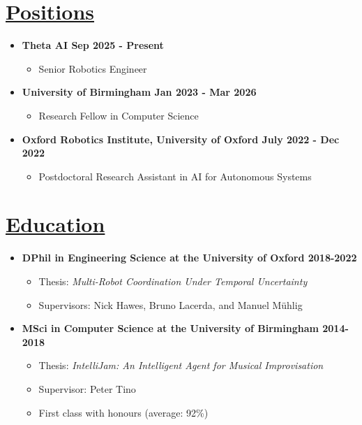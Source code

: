 \documentclass[11pt]{article}
\begin{document}
\section*{\uline{Positions}}
\begin{itemize}
\item \textbf{Theta AI \hfill Sep 2025 - Present}
\begin{itemize}
    \item Senior Robotics Engineer
\end{itemize}
\item \textbf{University of Birmingham \hfill Jan 2023 - Mar 2026} 
\begin{itemize}
    \item Research Fellow in Computer Science
\end{itemize}
\item \textbf{Oxford Robotics Institute, University of Oxford \hfill July 2022 - Dec 2022} 
\begin{itemize}
    \item Postdoctoral Research Assistant in AI for Autonomous Systems
\end{itemize}
\end{itemize}
	
\section*{\uline{Education}}
\begin {itemize}
\item \textbf{DPhil in Engineering Science at the University of Oxford \hfill 2018-2022} 
\begin{itemize}
    \item Thesis: \emph{Multi-Robot Coordination Under Temporal Uncertainty}
    \item Supervisors: Nick Hawes, Bruno Lacerda, and Manuel M{\"u}hlig
\end{itemize}
			
\item \textbf{MSci in Computer Science at the University of Birmingham \hfill 2014-2018}
\begin{itemize}
\item Thesis: \emph{IntelliJam: An Intelligent Agent for Musical Improvisation}
\item Supervisor: Peter Tino
\item First class with honours (average: 92\%)
\end{itemize}
\end{itemize}
\end{document}
